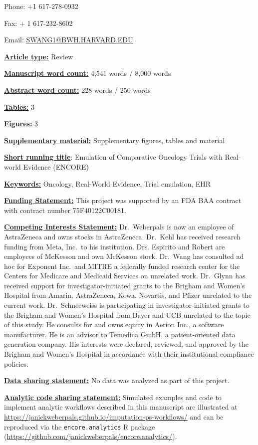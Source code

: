 \documentclass[
  letterpaper,
  DIV=11,
  numbers=noendperiod]{scrartcl}
\begin{document}
Phone: +1 617-278-0932

Fax: + 1 617-232-8602

Email: \url{SWANG1@BWH.HARVARD.EDU}

\ul{\textbf{Article type:}} Review

\ul{\textbf{Manuscript word count:}} 4,541 words / 8,000 words

\ul{\textbf{Abstract word count:}} 228 words / 250 words

\ul{\textbf{Tables:}} 3

\ul{\textbf{Figures:}} 3

\ul{\textbf{Supplementary material:}} Supplementary figures, tables and
material

\ul{\textbf{Short running title}}: Emulation of Comparative Oncology
Trials with Real-world Evidence (ENCORE)

\ul{\textbf{Keywords:}} Oncology, Real-World Evidence, Trial emulation,
EHR

\ul{\textbf{Funding Statement:}} This project was supported by an FDA
BAA contract with contract number 75F40122C00181.

\ul{\textbf{Competing Interests Statement:}} Dr.~Weberpals is now an
employee of AstraZeneca and owns stocks in AstraZeneca. Dr.~Kehl has
received research funding from Meta, Inc.~to his institution. Drs.
Espirito and Robert are employees of McKesson and own McKesson stock.
Dr.~Wang has consulted ad hoc for Exponent Inc.~and MITRE a federally
funded research center for the Centers for Medicare and Medicaid
Services on unrelated work. Dr.~Glynn has received support for
investigator-initiated grants to the Brigham and Women's Hospital from
Amarin, AstraZeneca, Kowa, Novartis, and Pfizer unrelated to the current
work. Dr.~Schneeweiss is participating in investigator-initiated grants
to the Brigham and Women's Hospital from Bayer and UCB unrelated to the
topic of this study. He consults for and owns equity in Aetion Inc., a
software manufacturer. He is an advisor to Temedica GmbH, a
patient-oriented data generation company. His interests were declared,
reviewed, and approved by the Brigham and Women's Hospital in accordance
with their institutional compliance policies.

\ul{\textbf{Data sharing statement:}} No data was analyzed as part of
this project.

\ul{\textbf{Analytic code sharing statement:}} Simulated examples and
code to implement analytic workflows described in this manuscript are
illustrated at
\url{https://janickweberpals.github.io/imputation-ps-workflows/} and can
be reproduced via the \texttt{encore.analytics} R package
(\url{https://github.com/janickweberpals/encore.analytics/}).
\end{document}

